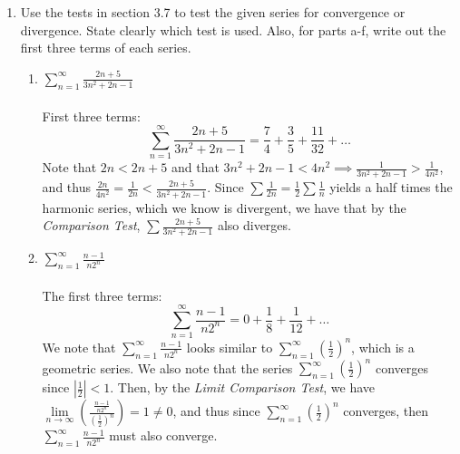 \documentclass[12pt,letterpaper]{article}
\newcommand{\limx}[2]{\displaystyle\lim\limits_{#1 \to #2}}
\newcommand{\abs}[1]{\left\lvert #1 \right\rvert}
\theoremstyle{case}
\theoremstyle{definition}
\begin{document}
\begin{enumerate}
		\item Use the tests in section 3.7 to test the given series for convergence or divergence. State clearly which test is used. Also, for parts a-f, write out the first three terms of each series.
		\begin{enumerate}
			\item $\displaystyle\sum_{n=1}^{\infty} \frac{2n+5}{3n^2+2n-1}$
			\\\\First three terms:
			\[\sum_{n=1}^{\infty} \frac{2n+5}{3n^2+2n-1} = \frac{7}{4}+\frac{3}{5}+\frac{11}{32}+\dots\]
			Note that $2n<2n+5$ and that $3n^2+2n-1<4n^2 \implies \frac{1}{3n^2+2n-1} > \frac{1}{4n^2}$, and thus $\frac{2n}{4n^2} = \frac{1}{2n} < \frac{2n+5}{3n^2+2n-1}$. Since $\sum \frac{1}{2n} = \frac{1}{2} \sum \frac{1}{n}$ yields a half times the harmonic series, which we know is divergent, we have that by the \textit{Comparison Test}, $\sum \frac{2n+5}{3n^2+2n-1}$ also diverges.\\
			\item $\displaystyle\sum_{n=1}^{\infty} \frac{n-1}{n2^n}$
			\\\\The first three terms:
			\[\sum_{n=1}^{\infty} \frac{n-1}{n2^n} = 0+ \frac{1}{8} + \frac{1}{12}+\dots\]
			We note that $\displaystyle\sum_{n=1}^{\infty} \frac{n-1}{n2^n}$ looks similar to $\displaystyle\sum_{n=1}^{\infty} \left(\frac{1}{2}\right)^n$, which is a geometric series. We also note that the series $\displaystyle\sum_{n=1}^{\infty} \left(\frac{1}{2}\right)^n$ converges since $\abs{\frac{1}{2}} < 1$. Then, by the \textit{Limit Comparison Test}, we have $\limx{n}{\infty} \left(\frac{\frac{n-1}{n2^n}}{\left(\frac{1}{2}\right)^n}\right)=1 \neq 0$, and thus since $\displaystyle\sum_{n=1}^{\infty} \left(\frac{1}{2}\right)^n$ converges, then $\displaystyle\sum_{n=1}^{\infty} \frac{n-1}{n2^n}$ must also converge.\\
			

\end{enumerate}
\end{enumerate}
\end{document}
